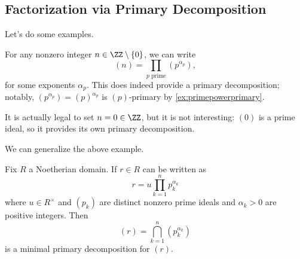 \subsection{Factorization via Primary Decomposition}
Let's do some examples.
\begin{example}
	For any nonzero integer $n\in\ZZ\setminus\{0\}$, we can write
	\[(n)=\prod_{p\text{ prime}}\left(p^{\alpha_p}\right),\]
	for some exponents $\alpha_p$. This does indeed provide a primary decomposition; notably, $\left(p^{\alpha_p}\right)=(p)^{\alpha_p}$ is $(p)$-primary by \autoref{ex:primepowerprimary}.
\end{example}
\begin{remark}[Nir]
	It is actually legal to set $n=0\in\ZZ$, but it is not interesting: $(0)$ is a prime ideal, so it provides its own primary decomposition.
\end{remark}
We can generalize the above example.
\begin{proposition} \label{prop:primdecompprincipals}
	Fix $R$ a Noetherian domain. If $r\in R$ can be written as
	\[r=u\prod_{k=1}^np_k^{\alpha_k}\]
	where $u\in R^\times$ and $(p_k)$ are distinct nonzero prime ideals and $\alpha_k>0$ are positive integers. Then
	\[(r)=\bigcap_{k=1}^n\left(p_k^{\alpha_k}\right)\]
	is a minimal primary decomposition for $(r)$.
\end{proposition}
